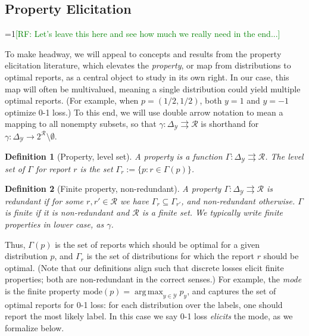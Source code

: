 \documentclass[12pt]{article}
\newcommand{\Comments}{1}
\newcommand{\mynote}[2]{\ifnum\Comments=1\textcolor{#1}{#2}\fi}
\newcommand{\mytodo}[2]{\ifnum\Comments=1%
  \todo[linecolor=#1!80!black,backgroundcolor=#1,bordercolor=#1!80!black]{#2}\fi}
\newcommand{\raf}[1]{\mynote{green}{[RF: #1]}}
\newcommand{\raft}[1]{\mytodo{green!20!white}{RF: #1}}
\newcommand{\jessiet}[1]{\mytodo{purple!20!white}{JF: #1}}
\newcommand{\mode}{\mathrm{mode}}
\newcommand{\simplex}{\Delta_\Y}
\newcommand{\R}{\mathcal{R}}
\newcommand{\Y}{\mathcal{Y}}
\newcommand{\toto}{\rightrightarrows}
\DeclareMathOperator*{\argmax}{arg\,max}
\newtheorem{definition}{Definition}
\begin{document}
\subsection{Property Elicitation}

\raf{Let's leave this here and see how much we really need in the end...}

To make headway, we will appeal to concepts and results from the property elicitation literature, which elevates the \emph{property}, or map from distributions to optimal reports, as a central object to study in its own right.
In our case, this map will often be multivalued, meaning a single distribution could yield multiple optimal reports.
(For example, when $p=(1/2,1/2)$, both $y=1$ and $y=-1$ optimize 0-1 loss.)
To this end, we will use double arrow notation to mean a mapping to all nonempty subsets, so that $\gamma: \simplex \toto \R$ is shorthand for $\gamma: \simplex \to 2^{\R} \setminus \emptyset$.

\begin{definition}[Property, level set]\label{def:property}
  A \emph{property} is a function $\Gamma:\simplex\toto\R$.
  The \emph{level set} of $\Gamma$ for report $r$ is the set $\Gamma_r := \{p : r \in \Gamma(p)\}$.
\end{definition}

\begin{definition}[Finite property, non-redundant]
  A property $\Gamma:\simplex\toto\R$ is \emph{redundant} if for some $r,r'\in\R$ we have $\Gamma_r \subseteq \Gamma_{r'}$, and \emph{non-redundant} otherwise.
  $\Gamma$ is \emph{finite} if it is non-redundant and $\R$ is a finite set.
  We typically write finite properties in lower case, as $\gamma$.
\end{definition}

Thus, $\Gamma(p)$ is the set of reports which should be optimal for a given distribution $p$, and $\Gamma_r$ is the set of distributions for which the report $r$ should be optimal.
(Note that our definitions align such that discrete losses elicit finite properties; both are non-redundant in the correct senses.)
For example, the \emph{mode} is the finite property $\mode(p) = \argmax_{y\in\Y} p_y$, and captures the set of optimal reports for 0-1 loss: for each distribution over the labels, one should report the most likely label.
In this case we say 0-1 loss \emph{elicits} the mode, as we formalize below.
\end{document}
